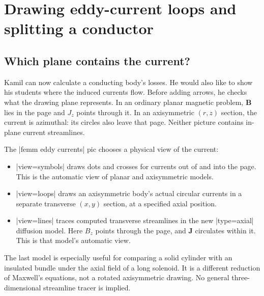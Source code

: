 \section{Drawing eddy-current loops and splitting a conductor}
\label{sec:currents}

\subsection{Which plane contains the current?}
Kamil can now calculate a conducting body's losses. He would also like to show
his students where the induced currents flow. Before adding arrows, he checks
what the drawing plane represents. In an ordinary planar magnetic problem,
$\mathbf B$ lies in the page and $J_z$ points through it. In an axisymmetric
$(r,z)$ section, the current is azimuthal: its circles also leave that page.
Neither picture contains in-plane current streamlines.

The |femm eddy currents| pic chooses a physical view of the current:
\begin{itemize}
\item |view=symbols| draws dots and crosses for currents out of and into the
page. This is the automatic view of planar and axisymmetric models.
\item |view=loops| draws an axisymmetric body's actual circular currents in a
separate transverse $(x,y)$ section, at a specified axial position.
\item |view=lines| traces computed transverse streamlines in the new
|type=axial| diffusion model. Here $B_z$ points through the page, and
$\mathbf J$ circulates within it. This is that model's automatic view.
\end{itemize}
The last model is especially useful for comparing a solid cylinder with an
insulated bundle under the axial field of a long solenoid. It is a different
reduction of Maxwell's equations, not a rotated axisymmetric drawing.
No general three-dimensional streamline tracer is implied.

